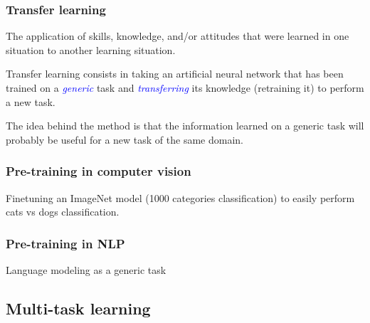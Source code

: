 \documentclass[10pt]{beamer}
\begin{document}
\begin{frame}

  \frametitle{Transfer learning}

  \begin{displayquote}[Perkins, 1992]
  The application of skills, knowledge, and/or attitudes that were
  learned in one situation to another learning situation.
  \end{displayquote}

  \bigskip

  Transfer learning consists in taking an artificial neural network
  that has been trained on a \textcolor{blue}{\emph{generic}} task and
  \textcolor{blue}{\emph{transferring}} its knowledge (retraining it)
  to perform a new task.

  \bigskip

  The idea behind the method is that the information learned on a
  generic task will probably be useful for a new task of the same
  domain.

\end{frame}

\begin{frame}

  \frametitle{Pre-training in computer vision}

  Finetuning an ImageNet model (1000 categories classification) to
  easily perform cats vs dogs classification.

\end{frame}

\begin{frame}

  \frametitle{Pre-training in NLP}

  Language modeling as a generic task

\end{frame}

\subsection{Multi-task learning}
\end{document}
